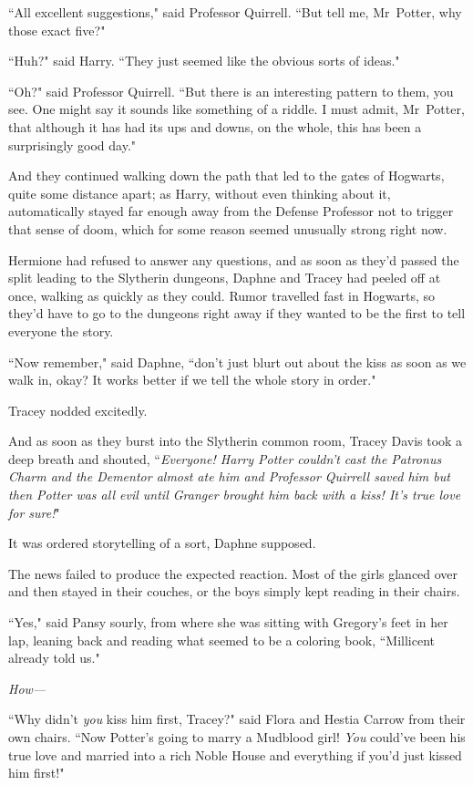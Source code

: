 ``All excellent suggestions," said Professor Quirrell. ``But tell me, Mr~Potter, why those exact five?"

``Huh?" said Harry. ``They just seemed like the obvious sorts of ideas."

``Oh?" said Professor Quirrell. ``But there is an interesting pattern to them, you see. One might say it sounds like something of a riddle. I must admit, Mr~Potter, that although it has had its ups and downs, on the whole, this has been a surprisingly good day."

And they continued walking down the path that led to the gates of Hogwarts, quite some distance apart; as Harry, without even thinking about it, automatically stayed far enough away from the Defense Professor not to trigger that sense of doom, which for some reason seemed unusually strong right now.


Hermione had refused to answer any questions, and as soon as they'd passed the split leading to the Slytherin dungeons, Daphne and Tracey had peeled off at once, walking as quickly as they could. Rumor travelled fast in Hogwarts, so they'd have to go to the dungeons right away if they wanted to be the first to tell everyone the story.

``Now remember," said Daphne, ``don't just blurt out about the kiss as soon as we walk in, okay? It works better if we tell the whole story in order."

Tracey nodded excitedly.

And as soon as they burst into the Slytherin common room, Tracey Davis took a deep breath and shouted, ``\emph{Everyone! Harry Potter couldn't cast the Patronus Charm and the Dementor almost ate him and Professor Quirrell saved him but then Potter was all evil until Granger brought him back with a kiss! It's true love for sure!}"

It was ordered storytelling of a sort, Daphne supposed.

The news failed to produce the expected reaction. Most of the girls glanced over and then stayed in their couches, or the boys simply kept reading in their chairs.

``Yes," said Pansy sourly, from where she was sitting with Gregory's feet in her lap, leaning back and reading what seemed to be a coloring book, ``Millicent already told us."

\emph{How—}

``Why didn't \emph{you} kiss him first, Tracey?" said Flora and Hestia Carrow from their own chairs. ``Now Potter's going to marry a Mudblood girl! \emph{You} could've been his true love and married into a rich Noble House and everything if you'd just kissed him first!"


